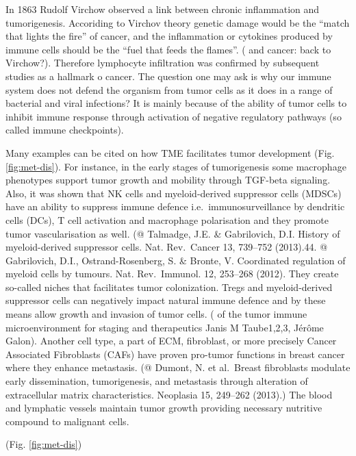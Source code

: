 \documentclass[12pt,]{book}
\theoremstyle{definition}
\theoremstyle{definition}
\theoremstyle{definition}
\theoremstyle{remark}
\begin{document}
In 1863 Rudolf Virchow observed a link between chronic inflammation and
tumorigenesis. Accoriding to Virchov theory genetic damage would be the
``match that lights the fire'' of cancer, and the inflammation or
cytokines produced by immune cells should be the ``fuel that feeds the
flames''. (\citet{Inflammation} and cancer: back to Virchow?). Therefore
lymphocyte infiltration was confirmed by subsequent studies as a
hallmark o cancer. The question one may ask is why our immune system
does not defend the organism from tumor cells as it does in a range of
bacterial and viral infections? It is mainly because of the ability of
tumor cells to inhibit immune response through activation of negative
regulatory pathways (so called immune checkpoints).

Many examples can be cited on how TME facilitates tumor development
(Fig. \ref{fig:met-dis}). For instance, in the early stages of
tumorigenesis some macrophage phenotypes support tumor growth and
mobility through TGF-beta signaling. Also, it was shown that NK cells
and myeloid-derived suppressor cells (MDSCs) have an ability to suppress
immune defence i.e.~immunosurveillance by dendritic cells (DCs), T cell
activation and macrophage polarisation and they promote tumor
vascularisation as well. (@ Talmadge, J.E. \& Gabrilovich, D.I. History
of myeloid-derived suppressor cells. Nat. Rev.~Cancer 13, 739--752
(2013).44. @ Gabrilovich, D.I., Ostrand-Rosenberg, S. \& Bronte, V.
Coordinated regulation of myeloid cells by tumours. Nat. Rev.~Immunol.
12, 253--268 (2012). They create so-called niches that facilitates tumor
colonization. Tregs and myeloid-derived suppressor cells can negatively
impact natural immune defence and by these means allow growth and
invasion of tumor cells. (\citet{Implications} of the tumor immune
microenvironment for staging and therapeutics Janis M Taube1,2,3, Jérôme
Galon). Another cell type, a part of ECM, fibroblast, or more precisely
Cancer Associated Fibroblasts (CAFs) have proven pro-tumor functions in
breast cancer where they enhance metastasis. (@ Dumont, N. et al.~Breast
fibroblasts modulate early dissemination, tumorigenesis, and metastasis
through alteration of extracellular matrix characteristics. Neoplasia
15, 249--262 (2013).) The blood and lymphatic vessels maintain tumor
growth providing necessary nutritive compound to malignant cells.

(Fig. \ref{fig:met-dis})
\end{document}
